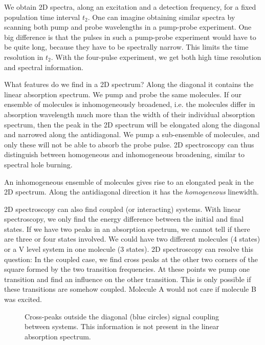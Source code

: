 We obtain 2D spectra, along an excitation and a detection frequency, for a fixed population time interval $t_2$. One can imagine obtaining similar spectra by scanning both pump and probe wavelengths in a pump-probe experiment. One big difference is that the pulses in such a pump-probe experiment would have to be quite long, because they have to be spectrally narrow. This limits the time resolution in $t_2$. With the four-pulse experiment, we get both high time resolution and spectral information.

What features do we find in a 2D spectrum? Along the diagonal it contains the linear absorption spectrum. We pump and probe the same molecules. If our ensemble of molecules is inhomogeneously broadened, i.e. the molecules differ in absorption wavelength much more than the width of their individual absorption spectrum, then the peak in the 2D spectrum will be elongated along the diagonal and narrowed along the antidiagonal. We pump a sub-ensemble of molecules, and only these will not be able to absorb the probe pulse. 2D spectroscopy can thus distinguish between homogeneous and inhomogeneous broadening, similar to spectral hole burning.


\begin{marginfigure}

\caption{An inhomogeneous ensemble of molecules gives rise to an elongated peak in the 2D spectrum. Along the antidiagonal direction it has the \emph{homogeneous} linewidth.}\label{fig:2d_inhom_broadening}
\end{marginfigure}



2D spectroscopy can also find coupled (or interacting) systems. With linear spectroscopy, we only find the energy difference between the initial and final states. If we have two peaks in an absorption spectrum, we cannot tell if there are three or four states involved. We could have two different molecules (4 states) or a V level system in one molecule (3 states). 2D spectroscopy can resolve this question: In the coupled case, we find cross peaks at the other two corners of the square formed by the two transition frequencies. At these points we pump one transition and find an influence on the other transition. This is only possible if these transitions are somehow coupled. Molecule A would not care if molecule B was excited.

\begin{figure}

\caption{Cross-peaks outside the diagonal (blue circles) signal coupling between systems. This information is not present in the linear absorption spectrum.}
\label{fig_2d_crosspeak}
\end{figure}


